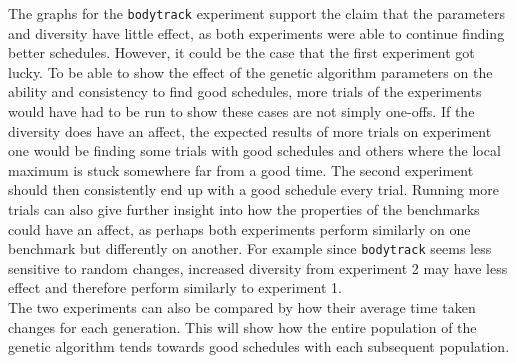 \documentclass{article}
\newcommand{\n}[0]{\\[\baselineskip]}
\begin{document}
The graphs for the \texttt{bodytrack} experiment support the claim that the parameters and diversity have little effect, as both experiments were able to continue finding better schedules. However, it could be the case that the first experiment got lucky. To be able to show the effect of the genetic algorithm parameters on the ability and consistency to find good schedules, more trials of the experiments would have had to be run to show these cases are not simply one-offs. If the diversity does have an affect, the expected results of more trials on experiment one would be finding some trials with good schedules and others where the local maximum is stuck somewhere far from a good time. The second experiment should then consistently end up with a good schedule every trial. Running more trials can also give further insight into how the properties of the benchmarks could have an affect, as perhaps both experiments perform similarly on one benchmark but differently on another. For example since \texttt{bodytrack} seems less sensitive to random changes, increased diversity from experiment 2 may have less effect and therefore perform similarly to experiment 1. 
\n
The two experiments can also be compared by how their average time taken changes for each generation. This will show how the entire population of the genetic algorithm tends towards good schedules with each subsequent population.
\end{document}

